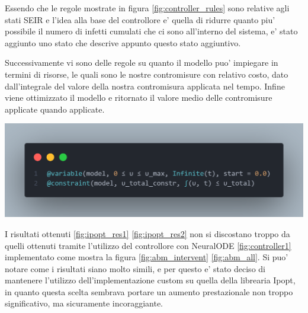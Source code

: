 Essendo che le regole mostrate in figura \ref{fig:controller_rules} sono relative agli stati 
SEIR e l'idea alla base del controllore e' quella di ridurre quanto piu' possibile il numero di
infetti cumulati che ci sono all'interno del sistema, e' stato aggiunto uno stato che descrive
appunto questo stato aggiuntivo.

Successivamente vi sono delle regole su quanto il modello puo' impiegare in termini di risorse, 
le quali sono le nostre contromisure con relativo costo, dato dall'integrale del valore della nostra
contromisura applicata nel tempo. Infine viene ottimizzato il modello e ritornato il valore medio delle contromisure applicate
quando applicate. 

\begin{minipage}{\linewidth}
	\centering
	\includegraphics[width=\textwidth]{img/controller_rules_1.png}
	\label{fig:controller_rules_1}
\end{minipage}

I risultati ottenuti \ref{fig:ipopt_res1} \ref{fig:ipopt_res2} non si discostano troppo da quelli ottenuti tramite l'utilizzo del controllore con 
NeuralODE \ref{fig:controller1} implementato come mostra la figura \ref{fig:abm_intervent} \ref{fig:abm_all}. Si puo' notare
come i risultati siano molto simili, e per questo e' stato deciso di mantenere l'utilizzo dell'implementazione 
custom su quella della librearia Ipopt, in quanto questa scelta sembrava portare un aumento prestazionale non 
troppo significativo, ma sicuramente incoraggiante.

